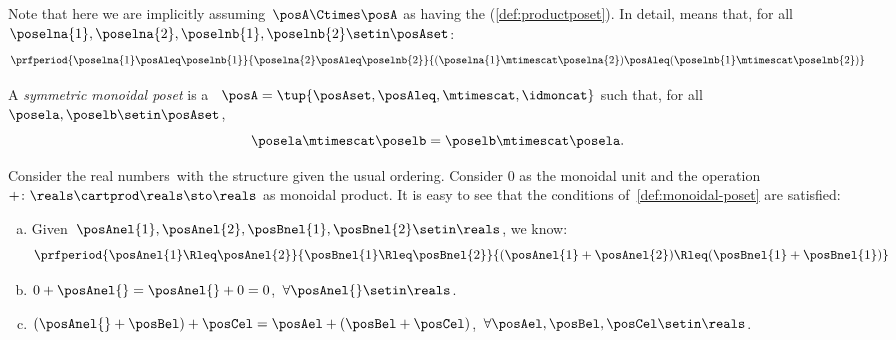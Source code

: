 Note that here we are implicitly assuming~$\posA \Ctimes \posA$ as having the  (\cref{def:productposet}).
In detail,  means that, for all~$\poselna{1}, \poselna{2}, \poselnb{1}, \poselnb{2} \setin \posAset$:
\begin{equation}
    \prfperiod{
        \poselna{1} \posAleq \poselnb{1}}{\poselna{2} \posAleq \poselnb{2}}{ (\poselna{1} \mtimescat  \poselna{2}) \posAleq  (\poselnb{1} \mtimescat  \poselnb{2})}
\end{equation}

\begin{ctdefinition}
    \label{def:sym-monoidal-poset}
    A \emph{symmetric monoidal poset} is a ~$\posA=\tup{\posAset, \posAleq, \mtimescat, \idmoncat}$ such that, for all~$\posela, \poselb \setin \posAset$,
    \begin{equation}
        \posela \mtimescat \poselb = \poselb \mtimescat \posela.
    \end{equation}
\end{ctdefinition}

\begin{example}
    \label{ex:monoidal-pos-reals}
    Consider the real numbers~\reals with the  structure given the usual ordering.
    Consider 0 as the monoidal unit and the operation~$+\colon \reals\cartprod \reals\sto \reals$ as monoidal product.
    It is easy to see that the conditions of~\cref{def:monoidal-poset} are satisfied:
    \begin{enumerate}[(a)]
        \item Given~$\posAnel{1},\posAnel{2},\posBnel{1},\posBnel{2}\setin \reals$, we know:
              \begin{equation}
                  \prfperiod{
                      \posAnel{1}\Rleq  \posAnel{2}
                  }{
                      \posBnel{1}\Rleq  \posBnel{2}
                  }{
                      (\posAnel{1}+\posAnel{2}) \Rleq  (\posBnel{1}+\posBnel{1})
                  }
              \end{equation}
        \item $0+\posAnel{}=\posAnel{}+0=0$,~$\forall \posAnel{}\setin \reals$.
        \item $(\posAnel{}+\posBel)+\posCel=\posAel+(\posBel+\posCel)$,~$\forall \posAel,\posBel,\posCel\setin \reals$.
    \end{enumerate}
\end{example}

